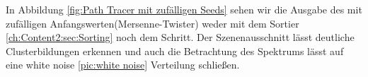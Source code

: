 In Abbildung \ref{fig:Path Tracer mit zufälligen Seeds} sehen wir die Ausgabe des 
mit zufälligen Anfangswerten(Mersenne-Twister) weder mit dem Sortier \ref{ch:Content2:sec:Sorting} noch dem 
 Schritt. Der Szenenausschnitt lässt deutliche Clusterbildungen erkennen und auch
die Betrachtung des Spektrums lässt auf eine white noise \ref{pic:white noise} Verteilung schließen.
